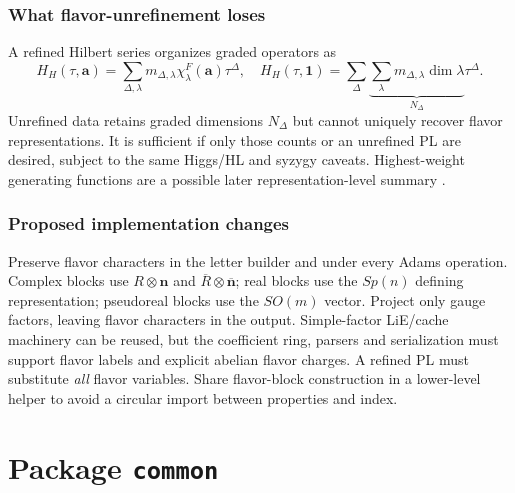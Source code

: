 \documentclass[11pt,a4paper]{article}
\numberwithin{equation}{section}
\begin{document}
\subsubsection{What flavor-unrefinement loses}
A refined Hilbert series organizes graded operators as
\begin{equation}
 H_H(\tau,\mathbf a)=\sum_{\Delta,\lambda}m_{\Delta,\lambda}
 \chi^F_\lambda(\mathbf a)\tau^\Delta,
 \quad H_H(\tau,\mathbf1)=\sum_\Delta
 \underbrace{\sum_\lambda m_{\Delta,\lambda}\dim\lambda}_{N_\Delta}\tau^\Delta.
 \label{eq:flavor-refinement}
\end{equation}
Unrefined data retains graded dimensions $N_\Delta$ but cannot uniquely recover
flavor representations. It is sufficient if only those counts or an unrefined
PL are desired, subject to the same Higgs/HL and syzygy caveats. Highest-weight
generating functions are a possible later representation-level summary
\cite{hwg}.

\subsubsection{Proposed implementation changes}
Preserve flavor characters in the letter builder and under every Adams
operation. Complex blocks use $R\otimes\mathbf n$ and
$\overline R\otimes\overline{\mathbf n}$; real blocks use the $Sp(n)$ defining
representation; pseudoreal blocks use the $SO(m)$ vector. Project only gauge
factors, leaving flavor characters in the output. Simple-factor LiE/cache
machinery can be reused, but the coefficient ring, parsers and serialization
must support flavor labels and explicit abelian flavor charges. A refined PL
must substitute \emph{all} flavor variables. Share flavor-block construction in
a lower-level helper to avoid a circular import between properties and index.

\clearpage
\section{Package \texttt{common}}\label{sec:common}
\end{document}
